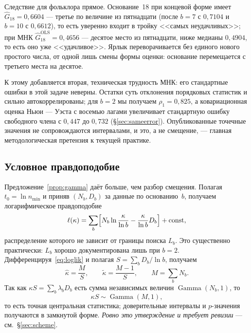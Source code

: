 \documentclass[11pt,a4paper]{article}
\theoremstyle{plain}
\theoremstyle{remark}
\DeclareMathOperator{\Gam}{Gamma}
\begin{document}
Следствие для фольклора прямое. Основание~18 при концевой форме имеет
$\hat G_{18}=0{,}6604$ --- третье по величине из пятнадцати (после $b=7$ с $0{,}7104$
и $b=10$ с $0{,}6612$), то есть уверенно входит в тройку <<самых неудачливых>>; при МНК
$\hat G_{18}^{\mathrm{OLS}}=0{,}4656$ --- десятое место из пятнадцати, ниже медианы
$0{,}4904$, то есть оно уже <<удачливое>>. Ярлык переворачивается без единого нового
простого числа, от одной лишь смены формы оценки: основание перемещается с третьего
места на десятое.

К этому добавляется вторая, техническая трудность МНК: его стандартные ошибки в этой задаче
неверны. Остатки суть отклонения порядковых статистик и сильно автокоррелированы;
для $b=2$ мы получаем $\rho_1=0{,}825$, а ковариационная оценка Ньюи --- Уэста с восемью
лагами увеличивает стандартную ошибку свободного члена с $0{,}447$ до $0{,}732$
(\S\ref{sec:sameerror}). Опубликованные точечные значения не сопровождаются интервалами,
и это, а не смещение, --- главная методологическая претензия к текущей практике.

\subsection{Условное правдоподобие}\label{sec:condlik}

Предложение~\ref{prop:gamma} даёт больше, чем разбор смещения. Полагая $t_0=\ln n_{\min}$
и приняв $(N_b,D_b)$ за данные по основанию~$b$, получаем логарифмическое правдоподобие
\begin{equation}\label{eq:loglik}
\ell(\kappa)=\sum_b\Bigl[N_b\ln\frac{\kappa}{\ln b}-\frac{\kappa}{\ln b}D_b\Bigr]+\mathrm{const},
\end{equation}
распределение которого не зависит от границы поиска $L_b$. Это существенно практически:
$L_b$ хорошо документирована лишь при $b=2$. Дифференцируя~\eqref{eq:loglik} и полагая
$S=\sum_b D_b/\ln b$, получаем
\begin{equation}\label{eq:mle}
\hat\kappa=\frac{M}{S},\qquad \tilde\kappa=\frac{M-1}{S},\qquad M=\sum_b N_b .
\end{equation}
Так как $\kappa S=\sum_b\lambda_bD_b$ есть сумма независимых величин $\Gam(N_b,1)$, то
\begin{equation}\label{eq:pivot}
\kappa S\sim\Gam(M,1),
\end{equation}
то есть точная центральная статистика; доверительные интервалы и $p$-значения получаются
в замкнутой форме. \emph{Ровно это утверждение и требует ревизии} --- см.~\S\ref{sec:scheme}.
\end{document}
